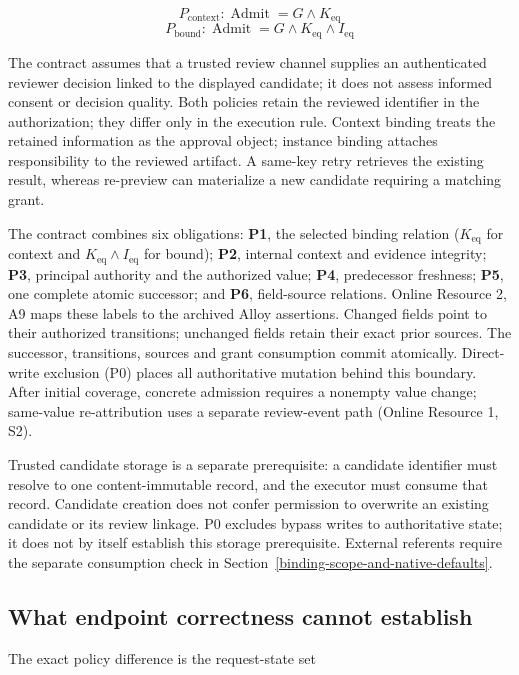 \documentclass[pdflatex,sn-basic]{sn-jnl}
\begin{document}
\[
P_{\mathrm{context}}: \operatorname{Admit} = G \land  K_{\mathrm{eq}}
\] \[
P_{\mathrm{bound}}:   \operatorname{Admit} = G \land  K_{\mathrm{eq}} \land  I_{\mathrm{eq}}
\]

The contract assumes that a trusted review channel supplies an authenticated reviewer decision linked to the displayed candidate; it does not assess informed consent or decision quality. Both policies retain the reviewed identifier in the authorization; they differ only in the execution rule. Context binding treats the retained information as the approval object; instance binding attaches responsibility to the reviewed artifact. A same-key retry retrieves the existing result, whereas re-preview can materialize a new candidate requiring a matching grant.

The contract combines six obligations: \textbf{P1}, the selected binding relation ($K_{\mathrm{eq}}$ for context and $K_{\mathrm{eq}}\land I_{\mathrm{eq}}$ for bound); \textbf{P2}, internal context and evidence integrity; \textbf{P3}, principal authority and the authorized value; \textbf{P4}, predecessor freshness; \textbf{P5}, one complete atomic successor; and \textbf{P6}, field-source relations. Online Resource 2, A9 maps these labels to the archived Alloy assertions. Changed fields point to their authorized transitions; unchanged fields retain their exact prior sources. The successor, transitions, sources and grant consumption commit atomically. Direct-write exclusion (P0) places all authoritative mutation behind this boundary. After initial coverage, concrete admission requires a nonempty value change; same-value re-attribution uses a separate review-event path (Online Resource 1, S2).

Trusted candidate storage is a separate prerequisite: a candidate identifier must resolve to one content-immutable record, and the executor must consume that record. Candidate creation does not confer permission to overwrite an existing candidate or its review linkage. P0 excludes bypass writes to authoritative state; it does not by itself establish this storage prerequisite. External referents require the separate consumption check in Section~\ref{binding-scope-and-native-defaults}.

\subsection{What endpoint correctness cannot establish}\label{what-endpoint-correctness-cannot-establish}

The exact policy difference is the request-state set
\end{document}
